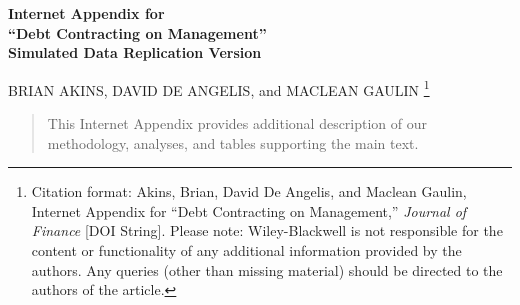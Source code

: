 \documentclass[12pt]{article}
\def \USRVarTitle{Debt Contracting on Management}
\begin{document}
{}



\begin{appendices}

\begin{center}%
{\large \bf Internet Appendix for
\vspace{12pt}
\\ ``\USRVarTitle''
\\ {\normalsize Simulated Data Replication Version}}

\vspace{24pt}

{BRIAN AKINS, DAVID DE ANGELIS, and MACLEAN GAULIN\vspace{-0.05cm}}%
    \footnote{Citation format: Akins, Brian, David De Angelis, and Maclean Gaulin, Internet Appendix for ``\USRVarTitle,'' \emph{Journal of Finance} [DOI String].
    Please note: Wiley-Blackwell is not responsible for the content or functionality of any additional information provided by the authors. Any queries (other than missing material) should be directed to the authors of the article.}
\end{center}

\vspace{12pt}

\begin{abstract}\noindent
This Internet Appendix provides additional description of our methodology, analyses, and tables supporting the main text.
\end{abstract}



\thispagestyle{empty}

\setcounter{section}{0}
\setcounter{subsection}{0}
\renewcommand{\thesection}{IA.\Alph{section}}
\renewcommand{\thesubsection}{\thesection.\arabic{subsection}}

\setcounter{equation}{0}
\renewcommand{\theequation}{\thesection.\arabic{equation}}
\renewcommand{\theequation}{IA.\arabic{equation}}%
\renewcommand{\thefigure}{IA.\arabic{figure}} \setcounter{figure}{0}
\renewcommand{\thetable}{IA.\Roman{table}} \setcounter{table}{0}







\end{appendices}
\end{document}
